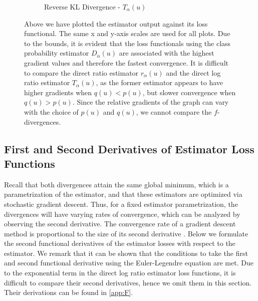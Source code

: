 \documentclass[honours,12pt]{unswthesis}
\numberwithin{equation}{section}
\theoremstyle{definition}
\begin{document}
\begin{figure}[h!]
\begin{subfigure}{0.49\textwidth}
\caption{Reverse KL Divergence - $T_\alpha(u)$}
\end{subfigure}
\caption{\small Above we have plotted the estimator output against its loss functional. The same x and y-axis scales are used for all plots. Due to the bounds, it is evident that the loss functionals using the class probability estimator $D_\alpha(u)$ are associated with the highest gradient values and therefore the fastest convergence. It is difficult to compare the direct ratio estimator $r_\alpha(u)$ and the direct log ratio estimator $T_\alpha(u)$, as the former estimator appears to have higher gradients when $q(u)<p(u)$, but slower convergence when $q(u)>p(u)$. Since the relative gradients of the graph can vary with the choice of $p(u)$ and $q(u)$, we cannot compare the $f$-divergences.}
\label{fig:7.1}
\end{figure}
\subsection{First and Second Derivatives of Estimator Loss Functions}
Recall that both divergences attain the same global minimum, which is a parametrization of the estimator, and that these estimators are optimized via stochastic gradient descent. Thus, for a fixed estimator parametrization, the divergences will have varying rates of convergence, which can be analyzed by observing the second derivative. The convergence rate of a gradient descent method is proportional to the size of its second derivative \citep{lecun}. Below we formulate the second functional derivatives of the estimator losses with respect to the estimator. We remark that it can be shown that the conditions to take the first and second functional derivative using the Euler-Legendre equation are met. Due to the exponential term in the direct log ratio estimator loss functions, it is difficult to compare their second derivatives, hence we omit them in this section. Their derivations can be found in \autoref{app:F}. 
\newpage 
\end{document}
